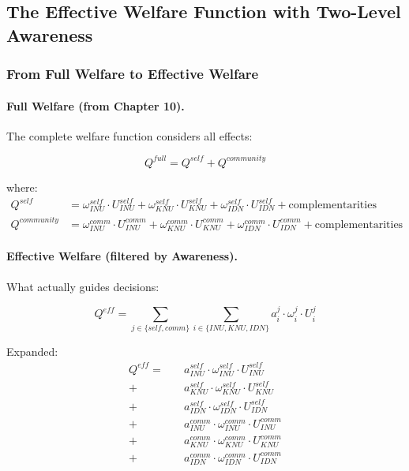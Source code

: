 \subsection{The Effective Welfare Function with Two-Level Awareness}
\label{subsec:effective-welfare-awareness}

\subsubsection{From Full Welfare to Effective Welfare}

\paragraph{Full Welfare (from Chapter 10).}
The complete welfare function considers all effects:

\begin{equation}
Q^{full} = Q^{self} + Q^{community}
\end{equation}

where:
\begin{align}
Q^{self} &= \omega^{self}_{INU} \cdot U^{self}_{INU} + \omega^{self}_{KNU} \cdot U^{self}_{KNU} + \omega^{self}_{IDN} \cdot U^{self}_{IDN} + \text{complementarities} \\
Q^{community} &= \omega^{comm}_{INU} \cdot U^{comm}_{INU} + \omega^{comm}_{KNU} \cdot U^{comm}_{KNU} + \omega^{comm}_{IDN} \cdot U^{comm}_{IDN} + \text{complementarities}
\end{align}

\paragraph{Effective Welfare (filtered by Awareness).}
What actually guides decisions:

\begin{equation}
\boxed{
Q^{eff} = \sum_{j \in \{self, comm\}} \sum_{i \in \{INU, KNU, IDN\}} a^j_i \cdot \omega^j_i \cdot U^j_i
}
\label{eq:effective-welfare-complete}
\end{equation}

Expanded:
\begin{align}
Q^{eff} = \quad & a^{self}_{INU} \cdot \omega^{self}_{INU} \cdot U^{self}_{INU} \nonumber \\
+ \quad & a^{self}_{KNU} \cdot \omega^{self}_{KNU} \cdot U^{self}_{KNU} \nonumber \\
+ \quad & a^{self}_{IDN} \cdot \omega^{self}_{IDN} \cdot U^{self}_{IDN} \nonumber \\
+ \quad & a^{comm}_{INU} \cdot \omega^{comm}_{INU} \cdot U^{comm}_{INU} \nonumber \\
+ \quad & a^{comm}_{KNU} \cdot \omega^{comm}_{KNU} \cdot U^{comm}_{KNU} \nonumber \\
+ \quad & a^{comm}_{IDN} \cdot \omega^{comm}_{IDN} \cdot U^{comm}_{IDN}
\end{align}

